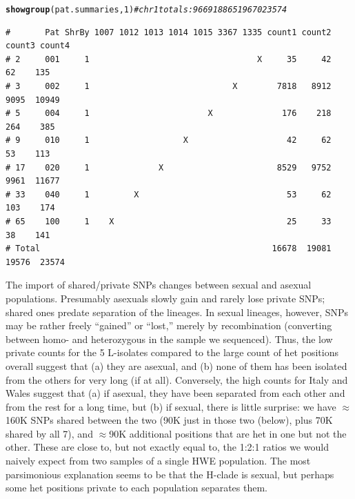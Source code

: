 \documentclass{article}\usepackage[]{graphicx}\usepackage[]{color}
\makeatletter
\newcommand{\hlnum}[1]{\textcolor[rgb]{0.686,0.059,0.569}{#1}}%
\newcommand{\hlcom}[1]{\textcolor[rgb]{0.678,0.584,0.686}{\textit{#1}}}%
\newcommand{\hlstd}[1]{\textcolor[rgb]{0.345,0.345,0.345}{#1}}%
\newcommand{\hlkwd}[1]{\textcolor[rgb]{0.737,0.353,0.396}{\textbf{#1}}}%
\newenvironment{kframe}{%
 \def\at@end@of@kframe{}%
 \ifinner\ifhmode%
  \def\at@end@of@kframe{\end{minipage}}%
  \begin{minipage}{\columnwidth}%
 \fi\fi%
 \def\FrameCommand##1{\hskip\@totalleftmargin \hskip-\fboxsep
 \colorbox{shadecolor}{##1}\hskip-\fboxsep
     \hskip-\linewidth \hskip-\@totalleftmargin \hskip\columnwidth}%
 \MakeFramed {\advance\hsize-\width
   \@totalleftmargin\z@ \linewidth\hsize
   \@setminipage}}%
 {\par\unskip\endMakeFramed%
 \at@end@of@kframe}
\newenvironment{knitrout}{}{} %
\makeatother
\begin{document}
\begin{knitrout}\footnotesize
{}\color{fgcolor}\begin{kframe}
\begin{alltt}
\hlkwd{showgroup}\hlstd{(pat.summaries,}\hlnum{1}\hlstd{)}  \hlcom{# chr1 totals: 9669  18865  19670  23574}
\end{alltt}
\begin{verbatim}
#       Pat ShrBy 1007 1012 1013 1014 1015 3367 1335 count1 count2 count3 count4
# 2     001     1                                  X     35     42     62    135
# 3     002     1                             X        7818   8912   9095  10949
# 5     004     1                        X              176    218    264    385
# 9     010     1                   X                    42     62     53    113
# 17    020     1              X                       8529   9752   9961  11677
# 33    040     1         X                              53     62    103    174
# 65    100     1    X                                   25     33     38    141
# Total                                               16678  19081  19576  23574
\end{verbatim}
\end{kframe}
\end{knitrout}

The import of shared/private SNPs changes between sexual and asexual populations.  Presumably asexuals 
slowly gain and rarely lose private SNPs; shared ones predate separation of the lineages.  In sexual 
lineages, however, SNPs may be rather freely ``gained'' or ``lost,'' merely by recombination (converting 
between homo- and heterozygous in the sample we sequenced). Thus, the low private counts for the 5 
L-isolates compared to the large count of het positions overall suggest that (a) they are asexual, 
and (b) none of them has been isolated from the others for very long (if at all).  Conversely, the 
high counts for Italy and Wales suggest that (a) if asexual, they have been separated from each other 
and from the rest for a long time, but (b) if sexual, there is little surprise: we have $\approx$160K 
SNPs shared between the two (90K just in those two (below), plus 70K shared by all 7), and $\approx$90K 
additional positions that are het in one but not the other.  These are close to, but not exactly equal 
to, the 1:2:1 ratios we would naively expect from two samples of a single HWE population.  The most 
parsimonious explanation seems to be that the H-clade is sexual, but perhaps some het positions private 
to each population separates them.
\end{document}
